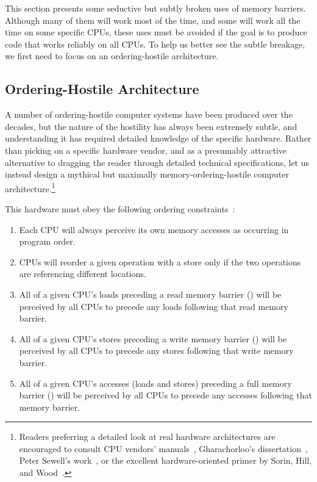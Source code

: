 This section presents some seductive but subtly broken uses of
memory barriers.
Although many of them will work most of the time, and some will
work all the time on some specific CPUs, these uses must be avoided
if the goal is to produce code that works reliably on all CPUs.
To help us better see the subtle breakage, we first need to focus
on an ordering-hostile architecture.

\subsection{Ordering-Hostile Architecture}
\label{sec:app:whymb:Ordering-Hostile Architecture}

A number of ordering-hostile computer systems have been produced over
the decades,
but the nature of the hostility has always been extremely subtle,
and understanding it has required detailed knowledge of the specific
hardware.
Rather than picking on a specific hardware vendor, and as a presumably
attractive alternative to dragging the reader through detailed
technical specifications, let us instead design a mythical but maximally
memory-ordering-hostile computer architecture.\footnote{
	Readers preferring a detailed look at real hardware
	architectures are encouraged to consult CPU vendors'
	manuals~\cite{ALPHA95,AMDOpteron02,IntelItanium02v2,PowerPC94,MichaelLyons05a,SPARC94,IntelXeonV3-96a,IntelXeonV2b-96a,IBMzSeries04a},
	Gharachorloo's dissertation~\cite{Gharachorloo95},
	Peter Sewell's work~\cite{PeterSewell2010weakmemory}, or
	the excellent hardware-oriented primer by
	Sorin, Hill, and Wood~\cite{DanielJSorin2011MemModel}.}

This hardware must obey the following ordering
constraints~\cite{PaulMcKenney2005i,PaulMcKenney2005j}:
\begin{enumerate}
\item	Each CPU will always perceive its own memory accesses
	as occurring in program order.
\item	CPUs will reorder a given operation with a store only
	if the two operations are referencing different locations.
\item	All of a given CPU's loads preceding a read memory barrier
	() will be perceived by all CPUs to precede
	any loads following that read memory barrier.
\item	All of a given CPU's stores preceding a write memory barrier
	() will be perceived by all CPUs to precede
	any stores following that write memory barrier.
\item	All of a given CPU's accesses (loads and stores) preceding a
	full memory barrier
	() will be perceived by all CPUs to precede
	any accesses following that memory barrier.
\end{enumerate}

